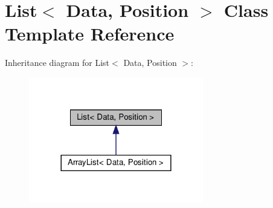 \hypertarget{class_list}{}\section{List$<$ Data, Position $>$ Class Template Reference}
\label{class_list}


Inheritance diagram for List$<$ Data, Position $>$\+:\nopagebreak
\begin{figure}[H]
\begin{center}
\leavevmode
\includegraphics[width=216pt]{class_list__inherit__graph}
\end{center}
\end{figure}
